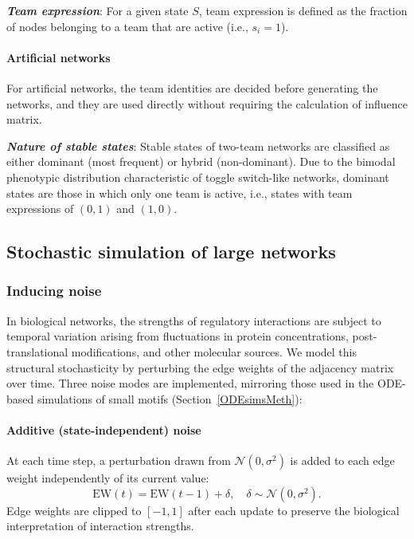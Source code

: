 \documentclass[11pt]{article}
\begin{document}
\noindent\textbf{\textit{Team expression}}\label{text:team_exp}: For a given state $S$, team expression is defined as the fraction of nodes belonging to a team that are active (i.e., $s_i = 1$).

\paragraph{Artificial networks} For artificial networks, the team identities are decided before generating the networks, and they are used directly without requiring the calculation of influence matrix.

\noindent\textbf{\textit{Nature of stable states}}: Stable states of two-team networks are classified as either dominant (most frequent) or hybrid (non-dominant). Due to the bimodal phenotypic distribution characteristic of toggle switch-like networks, dominant states are those in which only one team is active, i.e., states with team expressions of $(0,1)$ and $(1,0)$.

\subsection{Stochastic simulation of large networks}

\subsubsection{Inducing noise}\label{sssec:noise_def}

In biological networks, the strengths of regulatory interactions are subject to temporal variation arising from fluctuations in protein concentrations, post-translational modifications, and other molecular sources. We model this structural stochasticity by perturbing the edge weights of the adjacency matrix over time. Three noise modes are implemented, mirroring those used in the ODE-based simulations of small motifs (Section~\ref{ODEsimsMeth}):

\paragraph{Additive (state-independent) noise}
At each time step, a perturbation drawn from $\mathcal{N}(0, \sigma^2)$ is added to each edge weight independently of its current value:
\begin{equation}
    \mathrm{EW}(t) = \mathrm{EW}(t-1) + \delta, \quad \delta \sim \mathcal{N}(0, \sigma^2).
\end{equation}
Edge weights are clipped to $[-1, 1]$ after each update to preserve the biological interpretation of interaction strengths.
\end{document}
